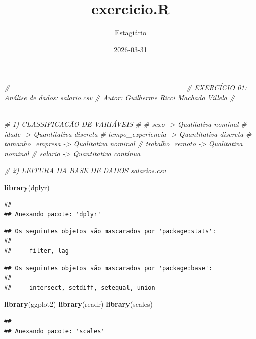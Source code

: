 \documentclass[
]{article}
\title{exercicio.R}
\author{Estagiário}
\date{2026-03-31}
\newenvironment{Shaded}{\begin{snugshade}}{\end{snugshade}}
\newcommand{\CommentTok}[1]{\textcolor[rgb]{0.56,0.35,0.01}{\textit{#1}}}
\newcommand{\FunctionTok}[1]{\textcolor[rgb]{0.13,0.29,0.53}{\textbf{#1}}}
\newcommand{\NormalTok}[1]{#1}
\begin{document}
\maketitle

\begin{Shaded}
\begin{Highlighting}[]
\CommentTok{\# = = = = = = = = = = = = = = = = = = = = = =  }
\CommentTok{\# EXERCÍCIO 01: Análise de dados: salario.csv}
\CommentTok{\# Autor: Guilherme Ricci Machado Villela}
\CommentTok{\# = = = = = = = = = = = = = = = = = = = = = =}

\CommentTok{\# 1) CLASSIFICACÃO DE VARIÁVEIS}
\CommentTok{\#}
\CommentTok{\# sexo              {-}\textgreater{} Qualitativa nominal}
\CommentTok{\# idade             {-}\textgreater{} Quantitativa discreta}
\CommentTok{\# tempo\_experiencia {-}\textgreater{} Quantitativa discreta}
\CommentTok{\# tamanho\_empresa   {-}\textgreater{} Qualitativa nominal}
\CommentTok{\# trabalho\_remoto   {-}\textgreater{} Qualitativa nominal}
\CommentTok{\# salario           {-}\textgreater{} Quantitativa contínua}

\CommentTok{\# 2) LEITURA DA BASE DE DADOS salarios.csv}

\FunctionTok{library}\NormalTok{(dplyr)}
\end{Highlighting}
\end{Shaded}

\begin{verbatim}
## 
## Anexando pacote: 'dplyr'
\end{verbatim}

\begin{verbatim}
## Os seguintes objetos são mascarados por 'package:stats':
## 
##     filter, lag
\end{verbatim}

\begin{verbatim}
## Os seguintes objetos são mascarados por 'package:base':
## 
##     intersect, setdiff, setequal, union
\end{verbatim}

\begin{Shaded}
\begin{Highlighting}[]
\FunctionTok{library}\NormalTok{(ggplot2)}
\FunctionTok{library}\NormalTok{(readr)}
\FunctionTok{library}\NormalTok{(scales)}
\end{Highlighting}
\end{Shaded}

\begin{verbatim}
## 
## Anexando pacote: 'scales'
\end{verbatim}
\end{document}
